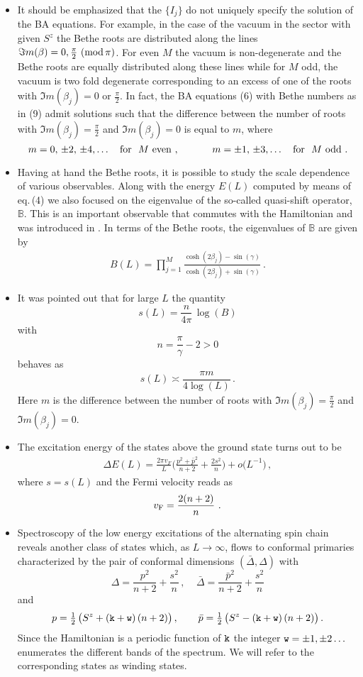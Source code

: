 \documentclass[12pt]{article}
\def\bea{\begin{eqnarray}}
\def\eea{\end{eqnarray}}
\def\be{\begin{equation}}
\def\ee{\end{equation}}
\def\be{\begin{equation}}
\def\ee{\end{equation}}
\def\bea{\begin{eqnarray}}
\def\eea{\end{eqnarray}}
\begin{document}
\begin{itemize}
\item
It should be emphasized that the $\{I_j\}$ do not uniquely specify the solution of the BA equations. For example, in the case of the vacuum in the sector with given $S^z$ the Bethe roots are distributed along the lines $\Im m(\beta)=0,\frac{\pi}{2} \ ({\rm mod} \, \pi)$. For even $M$ the vacuum is non-degenerate and the Bethe roots are equally distributed along these lines while for $M$ odd, the vacuum is two
fold degenerate corresponding to an excess of one of the roots with $\Im m(\beta_j)=0$ or $\frac{\pi}{2}$. In fact, the BA equations (6) with Bethe numbers as in (9)
admit solutions such that the difference between the number of roots with
$\Im m(\beta_j)=\frac{\pi}{2}$ and 
$\Im m(\beta_j)=0$ is equal to $m$, where
\be
m=0,\,\pm2,\,\pm4,\ldots \ \ \ {\rm for} \ \ M{\rm \ even} \ , \ \ \ \ \ \ \ \ \ \ 
m=\pm1,\,\pm3,\ldots \ \ \ {\rm for} \ \ M{\rm\  odd} \ .
\ee

\item
Having at hand the Bethe roots, it is possible to study the scale dependence of various observables. Along with the energy $E(L)$ computed by means of eq.\,(4) we also focused on the eigenvalue of the so-called quasi-shift operator, $\mathbb{B}$. This is an important observable that commutes with the Hamiltonian and was introduced in \cite{Ikhlef:2011ay}. In terms of the Bethe roots, the eigenvalues of $\mathbb{B}$ are given by
\bea
B(L)=\prod_{j=1}^M\frac{\cosh(2\beta_j)-\sin(\gamma)}{\cosh(2\beta_j)+\sin(\gamma)}\  .
\eea

\item 
It was pointed out  \cite{Ikhlef:2011ay,Candu:2013fva,Frahm:2013cma} that for large $L$ the quantity 
\be
s(L)= \frac{n}{4\pi}\,\log (B)
\ee
with
\be
n=\frac{\pi}{\gamma}-2>0 \nonumber
\ee
behaves as
\be
s(L)\asymp\frac{\pi m}{4\log(L)}\,.
\ee
Here $m$ is the difference between the number of roots with
$\Im m (\beta_j)=\frac{\pi}{2}$ and $\Im m (\beta_j)=0$.

\item
The excitation energy of the states above the ground state turns out to be
\bea
\Delta E(L) = \frac{2\pi v_F}{L}\bigg(\frac{p^2+{\bar p}^2}{n+2}+\frac{2s^2}{n}\bigg) +o\big(L^{-1}\big)\,,
\eea
where $s=s(L)$ and the Fermi velocity reads as 
\be
v_{\rm F}=\frac{2(n+2)}{n}\ .
\ee

\item
Spectroscopy of the low energy excitations of the alternating spin chain reveals another class of states which, as $L\to \infty$, flows to  conformal primaries characterized by the pair of conformal dimensions $(\bar{\Delta},{\Delta})$ with
\be\label{cdeq1}
\Delta=\frac{p^2}{n+2}+\frac{s^2}{n}\, , \ \ \ \ \ {\bar \Delta}=\frac{{\bar p}^2}{n+2}+\frac{s^2}{n}
\ee
and
\be\label{cdeq2}
p=\tfrac{1}{2}\,\big(S^z+({\tt k}+{\tt w})\,(n+2)\big)\, , \qquad \bar{p}=\tfrac{1}{2}\,\big(S^z-({\tt k}+{\tt w})\,(n+2)\big)\, .
\ee
Since the Hamiltonian is a periodic function of ${\tt k}$ the integer  ${\tt w}=\pm 1,\pm 2\ldots\ $ enumerates the different bands of the spectrum. We will refer to the corresponding states as winding states. 

\end{itemize}
\end{document}
